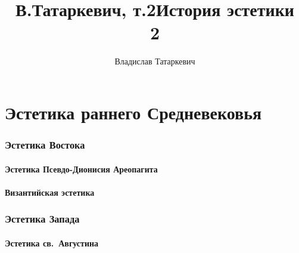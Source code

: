 \documentclass[a4paper,12pt]{article}
\title{В.Татаркевич, т.2}
\author{Владислав Татаркевич}
\title{История эстетики \\ 2}
\date{}
\begin{document}
\maketitle

\renewcommand{\thinspace}{\,}

\renewcommand{\thesection}{\alph{section}.}

\renewcommand{\thesubsection}{\arabic{subsection}.}

\renewcommand{\thesubsubsection}{\arabic {subsubsection}.}




\newpage

\tableofcontents

\newpage

\part{Эстетика раннего Средневековья}
\section{Эстетика Востока}








\subsection{Эстетика Псевдо-Дионисия Ареопагита}\label{sec:pseudo_dionizy}


\subsection{Византийская эстетика}\label{sec:bizantynistyka}


\newpage
\section{Эстетика Запада}

\subsection{Эстетика св.~Августина}\label{subsec:sw_august}
\end{document}
